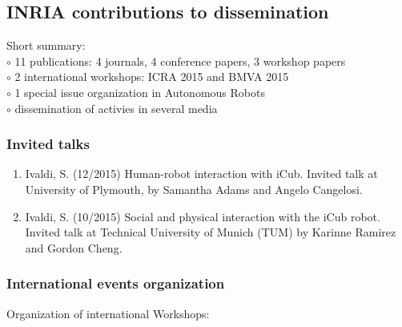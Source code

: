 \subsection{INRIA contributions to dissemination}

Short summary:\\
$\circ$ 11 publications: 4 journals, 4 conference papers, 3 workshop papers\\
$\circ$ 2 international workshops: ICRA 2015 and BMVA 2015\\
$\circ$ 1 special issue organization in Autonomous Robots\\
$\circ$ dissemination of activies in several media



\subsubsection{Invited talks}

\begin{enumerate}
\item  Ivaldi, S. (12/2015) Human-robot interaction with iCub. Invited talk at University of Plymouth, by Samantha Adams and Angelo Cangelosi.
\item Ivaldi, S. (10/2015) Social and physical interaction with the iCub robot. Invited talk at Technical University of Munich (TUM) by Karinne Ramirez and Gordon Cheng.

\end{enumerate}

%
%
%
%

\subsubsection{International events organization}

Organization of international Workshops:

